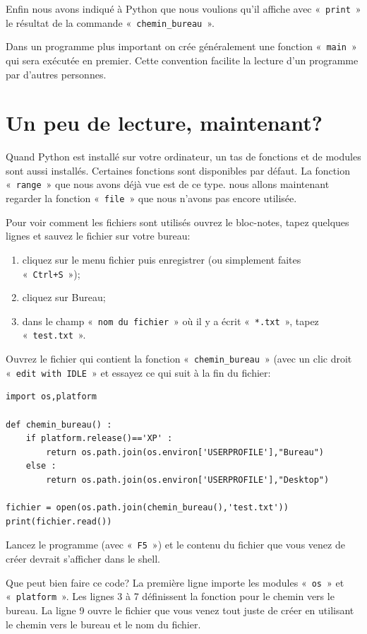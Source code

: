Enfin nous avons indiqué à Python que nous voulions qu'il affiche avec «~\texttt{print}~» le résultat de la commande «~\texttt{chemin\_bureau}~».

Dans un programme plus important on crée généralement une fonction «~\texttt{main}~» qui sera exécutée en premier. Cette convention facilite la lecture d'un programme par d'autres personnes.

\section{Un peu de lecture, maintenant?}
Quand Python est installé sur votre ordinateur, un tas de fonctions et de modules sont aussi installés. Certaines fonctions sont disponibles par défaut. La fonction «~\texttt{range}~» que nous avons déjà vue est de ce type. nous allons maintenant regarder la fonction «~\texttt{file}~» que nous n'avons pas encore utilisée.

Pour voir comment les fichiers sont utilisés ouvrez le bloc-notes, tapez quelques lignes et sauvez le fichier sur votre bureau:
\begin{enumerate}
\item cliquez sur le menu fichier puis enregistrer (ou simplement faites «~\texttt{Ctrl+S}~»);
\item cliquez sur Bureau;
\item dans le champ «~\texttt{nom du fichier}~» où il y a écrit «~\texttt{*.txt}~», tapez «~\texttt{test.txt}~».
\end{enumerate}

Ouvrez le fichier qui contient la fonction «~\texttt{chemin\_bureau}~» (avec un clic droit «~\texttt{edit with IDLE}~» et essayez ce qui suit à la fin du fichier:
\begin{Verbatim}[frame=single,rulecolor=\color{mbleu}, label=à taper]
import os,platform

def chemin_bureau() :
    if platform.release()=='XP' :
        return os.path.join(os.environ['USERPROFILE'],"Bureau")
    else :
        return os.path.join(os.environ['USERPROFILE'],"Desktop")
    
fichier = open(os.path.join(chemin_bureau(),'test.txt'))
print(fichier.read())
\end{Verbatim}

Lancez le programme (avec «~\texttt{F5}~») et le contenu du fichier que vous venez de créer devrait s'afficher dans le shell. 

Que peut bien faire ce code? La première ligne importe les modules «~\texttt{os}~»  et «~\texttt{platform}~». Les lignes 3 à 7 définissent la fonction pour le chemin vers le bureau.
La ligne 9 ouvre le fichier que vous venez tout juste de créer en utilisant le chemin vers le bureau et le nom du fichier.

